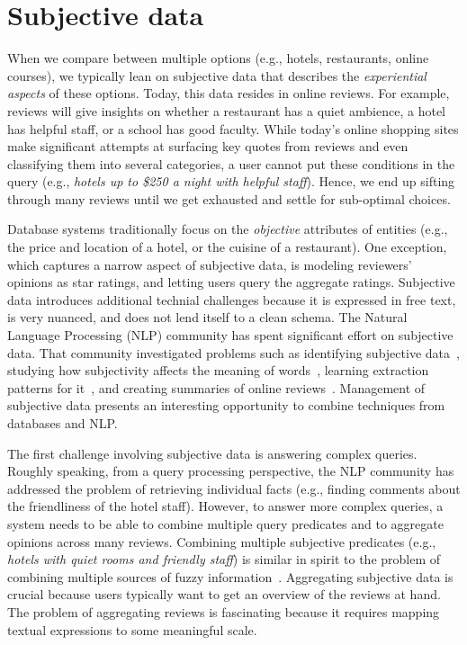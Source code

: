 \documentclass[11pt]{article}
\begin{document}
\section{Subjective data}
When we compare between multiple options (e.g., hotels, restaurants, online courses), we typically lean on subjective data that describes the {\em experiential aspects} of these options. Today, this data resides in online reviews. For example, reviews will give insights on whether a restaurant has a quiet ambience,   
a hotel has helpful staff, or a school has good faculty. While today's online shopping sites make significant attempts at surfacing key quotes from reviews and even classifying them into several categories, a user cannot put these conditions in the query  (e.g., {\em hotels up to \$250 a night with helpful staff}). Hence, we end up sifting through many reviews until we get exhausted and settle for sub-optimal choices. 

Database systems traditionally focus on the {\em objective} attributes of entities (e.g., the price and location of a hotel, or the cuisine of a restaurant). One exception, which captures a narrow aspect of subjective data, is modeling reviewers' opinions as star ratings, and letting users query the aggregate ratings. 
Subjective data introduces additional technial challenges because it is expressed in free text, is very nuanced, and  does not lend itself to a clean schema.   
The Natural Language Processing  (NLP) community has spent significant effort on subjective data. That community investigated problems such as identifying subjective data~\cite{DBLP:journals/coling/WiebeWBBM04}, studying how subjectivity affects the meaning of words~\cite{DBLP:conf/acl/WiebeM06}, learning extraction patterns for it~\cite{DBLP:journals/taffco/WiebeR11}, and creating summaries of online reviews~\cite{liu2012sentiment}.   Management of subjective data presents an interesting opportunity to combine techniques from databases and NLP.

The first challenge involving subjective data is answering complex queries. 
Roughly speaking, from a query processing perspective, the NLP community has addressed the problem of retrieving individual facts (e.g., finding comments about the friendliness of the hotel staff).  However, to answer more complex queries, a system needs to be able to combine multiple query predicates and to aggregate opinions across many reviews. Combining multiple subjective predicates (e.g., {\em hotels with quiet rooms and friendly staff}) is similar in spirit to the problem of combining multiple sources of fuzzy information~\cite{fagin1996combining}.  
Aggregating subjective data is crucial because users typically want to get an overview of the reviews at hand. The problem of aggregating reviews is fascinating because it requires mapping textual expressions to some meaningful scale. 
\end{document}
